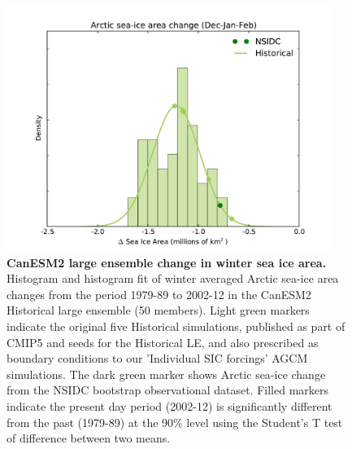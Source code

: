 \documentclass{nature}
\begin{document}
\begin{figure}%
\centering
\noindent\includegraphics[width=25pc]{Figure2b.pdf}
\caption{\textbf{CanESM2 large ensemble change in winter sea ice area.} Histogram and histogram fit of winter averaged Arctic sea-ice area changes from the period 1979-89 to 2002-12 in the CanESM2 Historical large ensemble (50 members). Light green markers indicate the original five Historical simulations, published as part of CMIP5 and seeds for the Historical LE, and also prescribed as boundary conditions to our ’Individual SIC forcings’ AGCM simulations. The dark green marker shows Arctic sea-ice change from the NSIDC bootstrap observational dataset. Filled markers indicate the present day period (2002-12) is significantly different from the past (1979-89) at the 90\% level using the Student’s T test of difference between two means. 
}
\label{fig:fig2} 
\end{figure}
\end{document}
